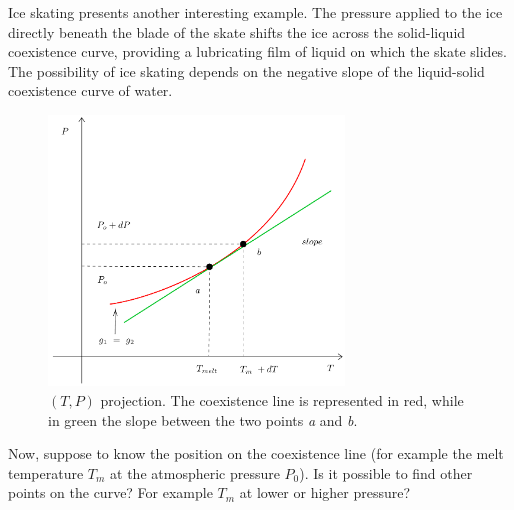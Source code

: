 \documentclass[../main/main.tex]{subfiles}
\begin{document}
\begin{remark}
Ice skating presents another interesting example. The pressure applied to the ice directly beneath the blade of the skate shifts the ice across the solid-liquid coexistence curve, providing a lubricating film of liquid on which the skate slides. The possibility of ice skating depends on the negative slope of the liquid-solid coexistence curve of water.
\end{remark}
\begin{figure}[h!]
\centering
\includegraphics[width=0.7\textwidth]{../lessons/3_image/2.pdf}
\caption{\label{fig:3_1} \( (T,P) \) projection. The coexistence line is represented in red, while in green the slope between the two points \emph{a} and \emph{b}.}
\end{figure}

Now, suppose to know the position on the coexistence line (for example the melt temperature \( T_m \) at the atmospheric pressure \( P_0 \)). Is it possible to find other points on the curve? For example \( T_m \) at lower or higher pressure?
\end{document}
